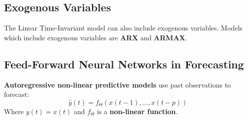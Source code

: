 \documentclass{article}
\begin{document}
\subsection{Exogenous Variables}
The Linear Time-Invariant model can also include exogenous variables. Models which include exogenous variables are \textbf{ARX} and \textbf{ARMAX}.

\subsection{Feed-Forward Neural Networks in Forecasting}
\textbf{Autoregressive non-linear predictive models} use past observations to forecast:
\[ \hat y(t) = f_\Theta(x(t-1), \dots, x(t-p)) \]
Where $y(t) = x(t)$ and $f_\Theta$ is a \textbf{non-linear function}.
\end{document}
